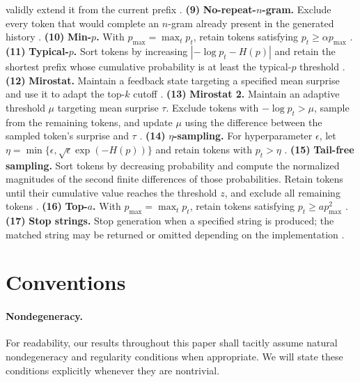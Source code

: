 \documentclass{article}
\begin{document}
validly extend it from the current prefix
\citep{llamacpp_grammar_filter,llamacpp_server}. \textbf{(9)}
\textbf{No-repeat-$n$-gram.} Exclude every token that would complete an $n$-gram
already present in the generated history \citep{huggingface_generation}. \textbf{(10)}
\textbf{Min-$p$.} With $p_{\max}=\max_t p_t$, retain tokens satisfying
$p_t\geq \alpha p_{\max}$ \citep{nguyen2025minp}. \textbf{(11)} \textbf{Typical-$p$.}
Sort tokens by increasing $|{-\log p_t}-H(p)|$ and retain the shortest prefix
whose cumulative probability is at least the typical-$p$ threshold
\citep{meister2023typical}. \textbf{(12)} \textbf{Mirostat.} Maintain a feedback state
targeting a specified mean surprise and use it to adapt the top-$k$ cutoff
\citep{basu2021mirostat}. \textbf{(13)} \textbf{Mirostat 2.} Maintain an adaptive
threshold $\mu$ targeting mean surprise $\tau$. Exclude tokens with $-\log
p_t>\mu$, sample from the remaining tokens, and update $\mu$ using the
difference between the sampled token's surprise and $\tau$
\citep{basu2021mirostat}. \textbf{(14)} \textbf{$\eta$-sampling.} For hyperparameter
$\epsilon$, let $\eta=\min\{\epsilon,\sqrt{\epsilon}\exp(-H(p))\}$ and retain
tokens with $p_t>\eta$ \citep{hewitt2022eta}. \textbf{(15)} \textbf{Tail-free sampling.}
Sort tokens by decreasing probability and compute the normalized magnitudes of
the second finite differences of those probabilities. Retain tokens until their
cumulative value reaches the threshold $z$, and exclude all remaining tokens
\citep{bricken_tailfree,koboldcpp_samplers}. \textbf{(16)} \textbf{Top-$a$.} With
$p_{\max}=\max_t p_t$, retain tokens satisfying $p_t\geq a p_{\max}^2$
\citep{koboldcpp_samplers}. \textbf{(17)} \textbf{Stop strings.} Stop generation when a
specified string is produced; the matched string may be returned or omitted
depending on the implementation
\citep{openai_chat_sampling,vllm_sampling_params}.

\section{Conventions}

\paragraph{Nondegeneracy.}
For readability, our results throughout this paper shall tacitly assume natural nondegeneracy and regularity
conditions when appropriate. We will state these conditions explicitly whenever they are nontrivial.
\end{document}
